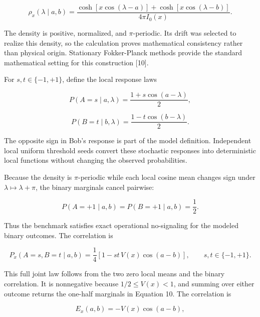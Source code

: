 \documentclass[
  american,
  11pt,
  letterpaper,
]{article}
\begin{document}
\begin{equation}
\rho_x(\lambda\mid a,b)=
\frac{\cosh[x\cos(\lambda-a)]+\cosh[x\cos(\lambda-b)]}
{4\pi I_0(x)} .
\tag{7}
\end{equation}

The density is positive, normalized, and \(\pi\)-periodic. Its drift was selected to realize this density, so the calculation proves mathematical consistency rather than physical origin. Stationary Fokker-Planck methods provide the standard mathematical setting for this construction {[}10{]}.

For \(s,t\in\{-1,+1\}\), define the local response laws

\begin{equation}
P(A=s\mid a,\lambda)=\frac{1+s\cos(a-\lambda)}{2},
\tag{8}
\end{equation}

\begin{equation}
P(B=t\mid b,\lambda)=\frac{1-t\cos(b-\lambda)}{2}.
\tag{9}
\end{equation}

The opposite sign in Bob's response is part of the model definition. Independent local uniform threshold seeds convert these stochastic responses into deterministic local functions without changing the observed probabilities.

Because the density is \(\pi\)-periodic while each local cosine mean changes sign under \(\lambda\mapsto\lambda+\pi\), the binary marginals cancel pairwise:

\begin{equation}
P(A=+1\mid a,b)=P(B=+1\mid a,b)=\frac12 .
\tag{10}
\end{equation}

Thus the benchmark satisfies exact operational no-signaling for the modeled binary outcomes. The correlation is

\begin{equation}
P_x(A=s,B=t\mid a,b)
=\frac14\left[1-st\,V(x)\cos(a-b)\right],
\qquad s,t\in\{-1,+1\}.
\tag{11}
\end{equation}

This full joint law follows from the two zero local means and the binary correlation. It is nonnegative because \(1/2\le V(x)<1\), and summing over either outcome returns the one-half marginals in Equation 10. The correlation is

\begin{equation}
E_x(a,b)=-V(x)\cos(a-b),
\tag{12}
\end{equation}
\end{document}
